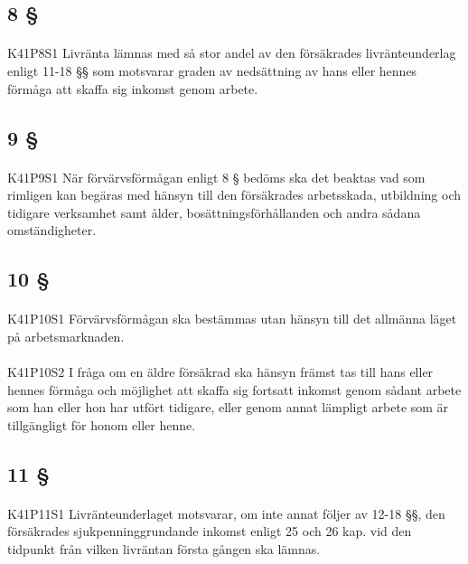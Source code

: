 \documentclass[a4paper,notitlepage,openany,10pt]{book}
\begin{document}
\subsection*{8 §}
\paragraph*{}
{\tiny K41P8S1}
Livränta lämnas med så stor andel av den försäkrades livränteunderlag enligt 11-18 §§ som motsvarar graden av nedsättning av hans eller hennes förmåga att skaffa sig inkomst genom arbete.
\subsection*{9 §}
\paragraph*{}
{\tiny K41P9S1}
När förvärvsförmågan enligt 8 § bedöms ska det beaktas vad som rimligen kan begäras med hänsyn till den försäkrades arbetsskada, utbildning och tidigare verksamhet samt ålder, bosättningsförhållanden och andra sådana omständigheter.
\subsection*{10 §}
\paragraph*{}
{\tiny K41P10S1}
Förvärvsförmågan ska bestämmas utan hänsyn till det allmänna läget på arbetsmarknaden.
\paragraph*{}
{\tiny K41P10S2}
I fråga om en äldre försäkrad ska hänsyn främst tas till hans eller hennes förmåga och möjlighet att skaffa sig fortsatt inkomst genom sådant arbete som han eller hon har utfört tidigare, eller genom annat lämpligt arbete som är tillgängligt för honom eller henne.
\subsection*{11 §}
\paragraph*{}
{\tiny K41P11S1}
Livränteunderlaget motsvarar, om inte annat följer av 12-18 §§, den försäkrades sjukpenninggrundande inkomst enligt 25 och 26 kap. vid den tidpunkt från vilken livräntan första gången ska lämnas.
\end{document}
